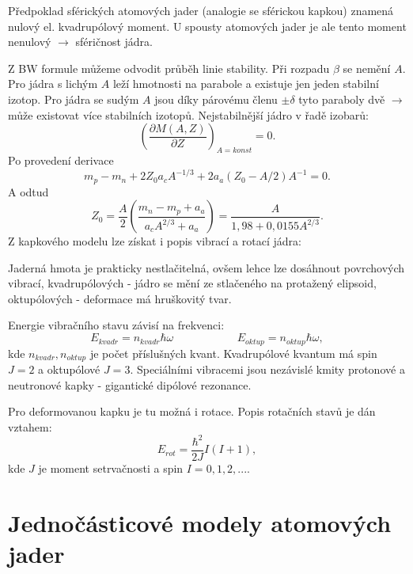 \documentclass[../../main.tex]{subfiles}
\begin{document}
Předpoklad sférických atomových jader (analogie se sférickou kapkou) znamená nulový el. kvadrupólový moment. U spousty atomových jader je ale tento moment nenulový $\rightarrow$ sféričnost jádra.

Z BW formule můžeme odvodit průběh linie stability. Při rozpadu $\beta$ se nemění $A$. Pro jádra s lichým $A$ leží hmotnosti na parabole a existuje jen jeden stabilní izotop. Pro jádra se sudým $A$ jsou díky párovému členu $\pm \delta$ tyto paraboly dvě $\rightarrow$ může existovat více stabilních izotopů. Nejstabilnější jádro v řadě izobarů:
\begin{equation}
\left( \dfrac{\partial M(A,Z)}{\partial Z}\right)_{A = konst} = 0. 
\end{equation}
Po provedení derivace
\begin{equation}
m_p - m_n + 2Z_0 a_c A^{-1/3} + 2 a_a (Z_0 - A/2)A^{-1} = 0.
\end{equation}
A odtud
\begin{equation}
Z_0 = \dfrac{A}{2} \left( \dfrac{m_n - m_p + a_a}{a_c A^{2/3} + a_a}\right) = \dfrac{A}{1,98 + 0,0155 A^{2/3}}.
\end{equation}
Z kapkového modelu lze získat i popis vibrací a rotací jádra:

Jaderná hmota je prakticky nestlačitelná, ovšem lehce lze dosáhnout povrchových vibrací, kvadrupólových - jádro se mění ze stlačeného na protažený elipsoid, oktupólových - deformace má hruškovitý tvar.

Energie vibračního stavu závisí na frekvenci:
\begin{equation}
E_{kvadr} = n_{kvadr} \hbar \omega ~~~~~~~~~~~~~~~~~~~~~~~~~~ E_{oktup} = n_{oktup} \hbar \omega,
\end{equation}
kde $n_{kvadr}, n_{oktup}$ je počet příslušných kvant. Kvadrupólové kvantum má spin $J = 2$ a oktupólové $J =3$. Speciálními vibracemi jsou nezávislé kmity protonové a neutronové kapky - gigantické dipólové rezonance. 

Pro deformovanou kapku je tu možná i rotace. Popis rotačních stavů je dán vztahem:
\begin{equation}
E_{rot} = \dfrac{\hbar ^2}{2 J} I(I+1),
\end{equation}
kde $J$ je moment setrvačnosti  a spin $I = 0,1,2,...$.

\section{Jednočásticové modely atomových jader}
\end{document}
